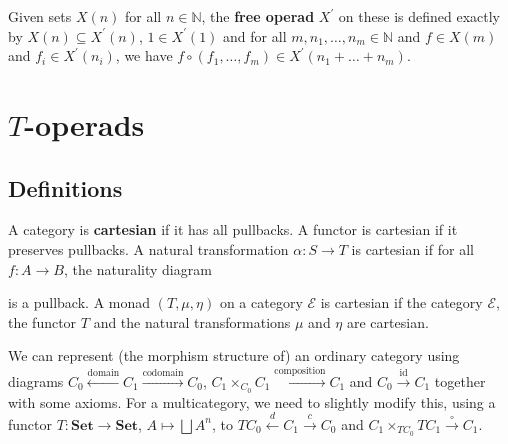 \documentclass{amsbook}
\newcommand{\Catb}[1]{\mathbf{#1}}
\newcommand{\SET}{\Catb{Set}}
\begin{document}
  Given sets $ X(n) $ for all $ n \in \mathbb N $, the \textbf{free operad} $ X^\prime $ on these is defined exactly by $ X(n) \subseteq X^\prime(n) $, $ 1 \in X^\prime(1) $ and for all $ m, n_1, \dots, n_m \in \mathbb N $ and $ f \in X(m) $ and $ f_i \in X^\prime(n_i) $, we have $ f \circ (f_1, \dots, f_m) \in X^\prime(n_1 + \dots + n_m) $.

  \section{\texorpdfstring{$ T $}{T}-operads}
  \subsection{Definitions}
  A category is \textbf{cartesian} if it has all pullbacks. A functor is cartesian if it preserves pullbacks. A natural transformation $ \alpha: S \to T $ is cartesian if for all $ f: A \to B $, the naturality diagram 
  \begin{center}
  \end{center}
  is a pullback. A monad $ (T, \mu, \eta) $ on a category $ \mathcal E $ is cartesian if the category $ \mathcal E $, the functor $ T $ and the natural transformations $ \mu $ and $ \eta $ are cartesian.

  We can represent (the morphism structure of) an ordinary category using diagrams $ C_0 \xleftarrow{\text{domain}} C_1 \xrightarrow{\text{codomain}} C_0 $, $ C_1 \times_{C_0} C_1 \xrightarrow{\text{composition}} C_1 $ and $ C_0 \xrightarrow{\text{id}} C_1 $ together with some axioms. For a multicategory, we need to slightly modify this, using a functor $ T: \SET \to \SET $, $ A \mapsto \bigsqcup A^n $, to $ T C_0 \xleftarrow{d} C_1 \xrightarrow{c} C_0 $ and $ C_1 \times_{T C_0} T C_1 \xrightarrow{\circ} C_1 $.
\end{document}
